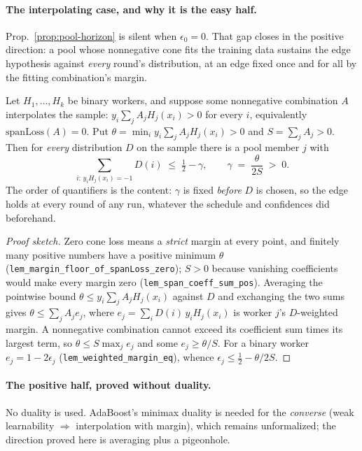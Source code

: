 \paragraph{The interpolating case, and why it is the easy half.} Prop.~\ref{prop:pool-horizon} is silent when $\epsilon_0=0$. That gap closes in the positive direction: a pool whose nonnegative cone fits the training data sustains the edge hypothesis against \emph{every} round's distribution, at an edge fixed once and for all by the fitting combination's margin.

\begin{proposition}
\label{prop:interpolating-pool}
Let $H_1,\dots,H_k$ be binary workers, and suppose some nonnegative combination $A$ interpolates the sample: $y_i\sum_j A_jH_j(x_i)>0$ for every $i$, equivalently $\mathrm{spanLoss}(A)=0$. Put $\theta=\min_i y_i\sum_j A_jH_j(x_i)>0$ and $S=\sum_j A_j>0$. Then for \emph{every} distribution $D$ on the sample there is a pool member $j$ with
\[
\sum_{i:\,y_iH_j(x_i)=-1} D(i) \;\le\; \tfrac12-\gamma, \qquad \gamma \;=\; \frac{\theta}{2S} \;>\; 0 .
\]
The order of quantifiers is the content: $\gamma$ is fixed \emph{before} $D$ is chosen, so the edge holds at every round of any run, whatever the schedule and confidences did beforehand.
\end{proposition}

\begin{proof}[Proof sketch]
Zero cone loss means a \emph{strict} margin at every point, and finitely many positive numbers have a positive minimum $\theta$ (\texttt{lem\_margin\_floor\_of\_spanLoss\_zero}); $S>0$ because vanishing coefficients would make every margin zero (\texttt{lem\_span\_coeff\_sum\_pos}). Averaging the pointwise bound $\theta\le y_i\sum_jA_jH_j(x_i)$ against $D$ and exchanging the two sums gives $\theta\le\sum_jA_je_j$, where $e_j=\sum_iD(i)\,y_iH_j(x_i)$ is worker $j$'s $D$-weighted margin. A nonnegative combination cannot exceed its coefficient sum times its largest term, so $\theta\le S\max_je_j$ and some $e_j\ge\theta/S$. For a binary worker $e_j=1-2\epsilon_j$ (\texttt{lem\_weighted\_margin\_eq}), whence $\epsilon_j\le\tfrac12-\theta/2S$.
\end{proof}

\paragraph{The positive half, proved without duality.} No duality is used. AdaBoost's minimax duality is needed for the \emph{converse} (weak learnability $\Rightarrow$ interpolation with margin), which remains unformalized; the direction proved here is averaging plus a pigeonhole.

